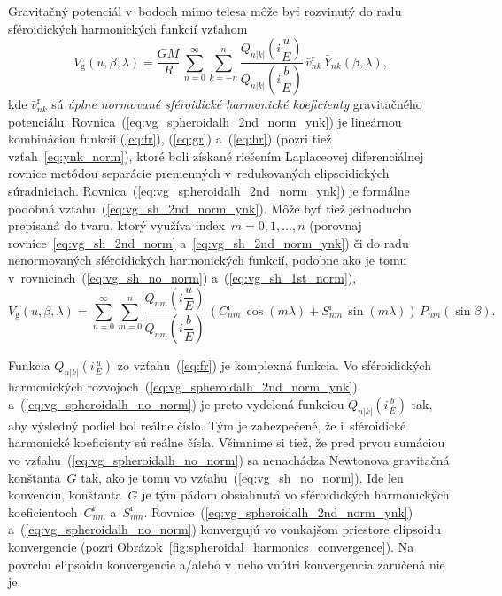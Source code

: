 \documentclass[a4paper,12pt]{book}
\newcommand{\gidx}{\mathrm g}
\begin{document}
Gravitačný potenciál v~bodoch mimo telesa môže byť rozvinutý do radu 
sféroidických harmonických funkcií vzťahom \parencite{MoritzPhysicalGeodesy}
%
\begin{equation}
\label{eq:vg_spheroidalh_2nd_norm_ynk}
V_\gidx(u, \beta, \lambda) = \frac{GM}{R} \, \sum_{n = 0}^\infty \sum_{k 
= -n}^n \frac{Q_{n|k|}\left( i \dfrac{u}{E} \right)}{Q_{n|k|}\left( 
i \dfrac{b}{E} \right)} \, \bar{v}^{\mathrm{r}}_{nk} \, \bar{Y}_{nk}(\beta, 
\lambda){,}
\end{equation}
%
kde $\bar{v}_{nk}^\mathrm{r}$ sú \emph{úplne normované sféroidické harmonické 
koeficienty} gravitačného potenciálu.  
Rovnica~(\ref{eq:vg_spheroidalh_2nd_norm_ynk}) je lineárnou kombináciou funkcií 
(\ref{eq:fr}), (\ref{eq:gr}) a~(\ref{eq:hr}) (pozri tiež 
vzťah~\ref{eq:ynk_norm}), ktoré boli získané riešením Laplaceovej 
diferenciálnej rovnice metódou separácie premenných v~redukovaných 
elipsoidických súradniciach.  Rovnica~(\ref{eq:vg_spheroidalh_2nd_norm_ynk}) je 
formálne podobná vzťahu~(\ref{eq:vg_sh_2nd_norm_ynk}).  Môže byť tiež 
jednoducho prepísaná do tvaru, ktorý využíva index~$m = 0, 1, \dots, n$ 
(porovnaj rovnice~\ref{eq:vg_sh_2nd_norm} a~\ref{eq:vg_sh_2nd_norm_ynk}) či do 
radu nenormovaných sféroidických harmonických funkcií, podobne ako je tomu 
v~rovniciach~(\ref{eq:vg_sh_no_norm}) a~(\ref{eq:vg_sh_1st_norm}),
%
\begin{equation}
\label{eq:vg_spheroidalh_no_norm}
V_\gidx(u, \beta, \lambda) = \sum_{n = 0}^\infty \sum_{m = 0}^n 
\frac{Q_{nm}\left( i \dfrac{u}{E} \right)}{Q_{nm}\left( i \dfrac{b}{E} \right)} 
\, \left( C^{\mathrm{r}}_{nm} \, \cos(m\lambda) + S^{\mathrm{r}}_{nm} \, 
\sin(m\lambda) \right) \, P_{nm}(\sin\beta){.}
\end{equation}

Funkcia $Q_{n|k|}\left( i \frac{u}{E} \right)$ zo vzťahu~(\ref{eq:fr}) je 
komplexná funkcia.  Vo sféroidických harmonických 
rozvojoch~(\ref{eq:vg_spheroidalh_2nd_norm_ynk}) 
a~(\ref{eq:vg_spheroidalh_no_norm}) je preto vydelená funkciou $Q_{n|k|}\left( 
i \frac{b}{E} \right)$ tak, aby výsledný podiel bol reálne číslo.  Tým je 
zabezpečené, že i~sféroidické harmonické koeficienty sú reálne čísla.  Všimnime 
si tiež, že pred prvou sumáciou vo vzťahu~(\ref{eq:vg_spheroidalh_no_norm}) sa 
nenachádza Newtonova gravitačná konštanta~$G$ tak, ako je tomu vo 
vzťahu~(\ref{eq:vg_sh_no_norm}).  Ide len konvenciu, konštanta~$G$ je tým pádom 
obsiahnutá vo sféroidických harmonických koeficientoch~$C_{nm}^\mathrm{r}$ 
a~$S_{nm}^\mathrm{r}$.  Rovnice~(\ref{eq:vg_spheroidalh_2nd_norm_ynk}) 
a~(\ref{eq:vg_spheroidalh_no_norm}) konvergujú vo vonkajšom priestore elipsoidu 
konvergencie (pozri Obrázok~\ref{fig:spheroidal_harmonics_convergence}).  Na 
povrchu elipsoidu konvergencie a/alebo v~neho vnútri konvergencia zaručená nie 
je.
\end{document}
